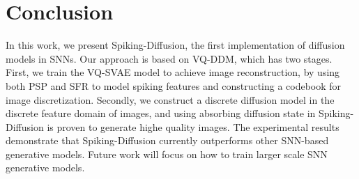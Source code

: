 \documentclass{article}
\begin{document}
\section{Conclusion}
In this work, we present Spiking-Diffusion, the first implementation of diffusion models in SNNs. Our approach is based on VQ-DDM, which has two stages. First, we train the VQ-SVAE model to achieve image reconstruction, by using both PSP and SFR to model spiking features and constructing a codebook for image discretization. Secondly, we construct a discrete diffusion model in the discrete feature domain of images, and using absorbing diffusion state in Spiking-Diffusion is proven to generate highe quality images. The experimental results demonstrate that Spiking-Diffusion currently outperforms other SNN-based generative models. Future work will focus on how to train larger scale SNN generative models.




\end{document}
